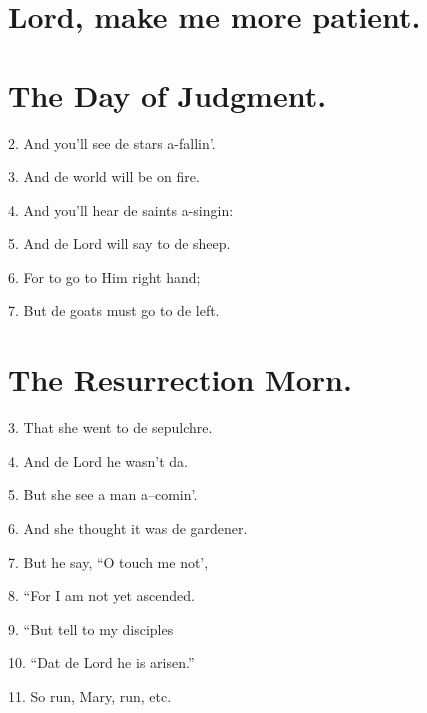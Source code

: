 \documentclass[a5paper,10pt]{book}
\begin{document}
\newpage
\section{Lord, make me more patient.}
\thispagestyle{empty}

\begin{song}

\end{song}

\newpage
\section{The Day of Judgment.}
\thispagestyle{empty}

\begin{song}

\end{song}


\begin{stanza}
\item[2.]
  And you'll see de stars a-fallin'.
\item[3.]
  And de world will be on fire.
\item[4.]
  And you'll hear de saints a-singin:
\item[5.]
  And de Lord will say to de sheep.
\item[6.]
  For to go to Him right hand;
\item[7.]
  But de goats must go to de left.
\end{stanza}


\newpage
\section{The Resurrection Morn.}
\thispagestyle{empty}

\begin{song}
\end{song}

\begin{stanza}
\item[3.]
  That she went to de sepulchre.
\item[4.]
  And de Lord he wasn't da.
\item[5.]
  But she see a man a--comin'.
\item[6.]
  And she thought it was de gardener.
\item[7.]
  But he say, ``O touch me not',
\item[8.]
  ``For I am not yet ascended.
\item[9.]
  ``But tell to my disciples
\item[10.]
  ``Dat de Lord he is arisen.''
\item[11.]
  So run, Mary, run, etc.
\end{stanza}
\end{document}
